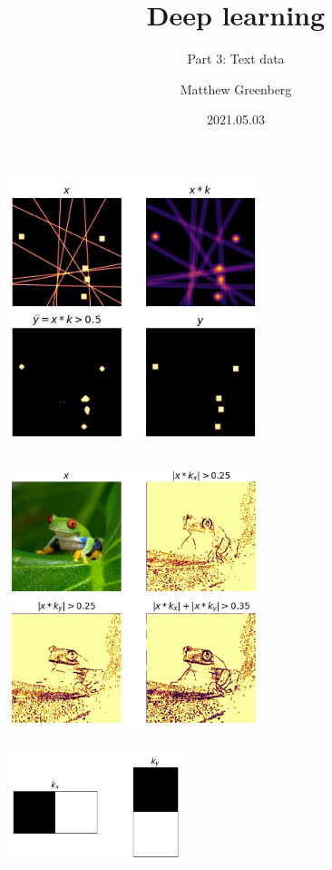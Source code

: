 \documentclass{beamer}
\title{Deep learning}
\subtitle{Part 3: Text data}
\author{Matthew Greenberg}
\date{2021.05.03}
\begin{document}
    \begin{frame}
    \maketitle
    \end{frame}

    


    \begin{frame}
        \frametitle{}
        \includegraphics[height=3in]{filter.jpg}
    \end{frame}

    \begin{frame}
        \frametitle{}
        \includegraphics[height=3in]{filtered-frogs.jpg}
    \end{frame}

    \begin{frame}
        \frametitle{}
        \includegraphics[width=2in]{edge-detectors.jpg}
    \end{frame}
\end{document}
